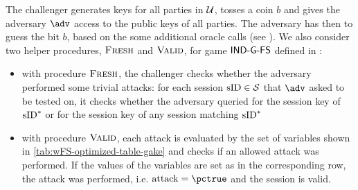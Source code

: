 The challenger generates keys for all parties in $\mathcal{U}$, tosses a coin $b$ and gives the adversary $\adv$ access to the public keys of all parties.
The adversary has then to guess the bit $b$, based on the some additional oracle calls (see ).
We also consider two helper procedures, $\textsc{Fresh}$ and $\textsc{Valid}$, for game $\mathsf{IND\mbox{-} G\mbox{-} FS}$ defined in :
\begin{itemize}
	\item with procedure $\textsc{Fresh}$, the challenger checks whether the adversary performed some trivial attacks: for each session $\text{sID}\in \mathcal{S}$ that $\adv$ asked to be tested on, it checks whether the adversary queried for the session key of $\text{sID}^*$ or for the session key of any session matching $\text{sID}^*$
	\item with procedure $\textsc{Valid}$, each attack is evaluated by the set of variables shown in \cref{tab:wFS-optimized-table-gake} and checks if an allowed attack was performed. 
	If the values of the variables are set as in the corresponding row, the attack was performed, i.e. $\attack=\pctrue$ and the session is valid.
\end{itemize}


